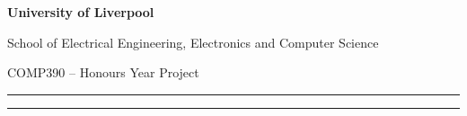 \cleardoublepage
\thispagestyle{empty}
\begin{titlepage}
    \centering
    \vspace*{1.6cm}

    {\large\bfseries University of Liverpool\par}
    {\large School of Electrical Engineering, Electronics and Computer
        Science\par}

    \vspace{1.4cm}
    {\large COMP390 -- Honours Year Project\par}

    \vfill
    \rule{\linewidth}{0.4pt}\par
    \vspace{0.6cm}
    {\Huge\bfseries \projecttitle\par}
    \vspace{0.6cm}
    \rule{\linewidth}{0.4pt}\par
    \vfill

    {\large \degree\par}
    \vspace{0.6cm}
    {\large \submissiondate\par}
\end{titlepage}
